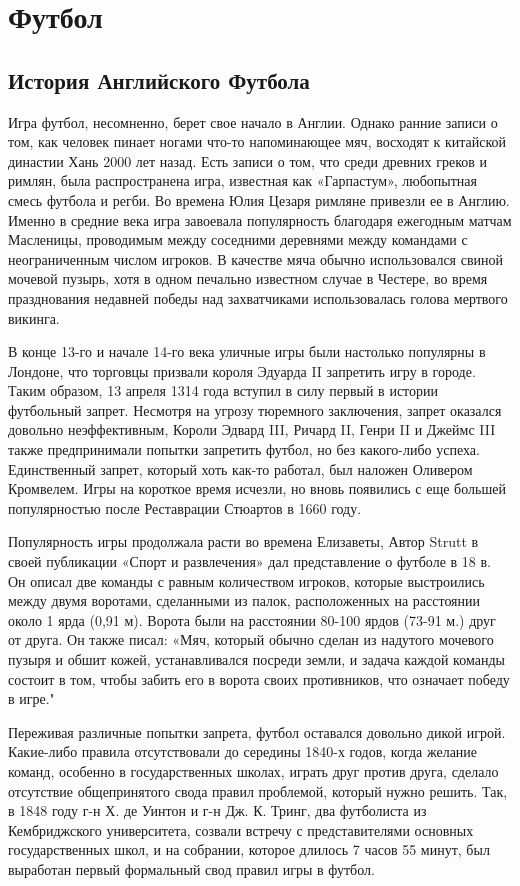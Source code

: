 \section{Футбол}
\subsection{История Английского Футбола}

Игра футбол, несомненно, берет свое начало в Англии. Однако ранние записи о том, как человек пинает ногами что-то напоминающее мяч, восходят к китайской династии Хань 2000 лет назад. Есть записи о том, что среди древних греков и римлян, была распространена игра, известная как «Гарпастум», любопытная смесь футбола и регби. Во времена Юлия Цезаря римляне привезли ее в Англию. Именно в средние века игра завоевала популярность благодаря ежегодным матчам Масленицы, проводимым между соседними деревнями между командами с неограниченным числом игроков. В качестве мяча обычно использовался свиной мочевой пузырь, хотя в одном печально известном случае в Честере, во время празднования недавней победы над захватчиками использовалась голова мертвого викинга.

В конце 13-го и начале 14-го века уличные игры были настолько популярны в Лондоне, что торговцы призвали короля Эдуарда II запретить игру в городе.  Таким образом, 13 апреля 1314 года вступил в силу первый в истории футбольный запрет. Несмотря на угрозу тюремного заключения, запрет оказался довольно неэффективным, Короли Эдвард III, Ричард II, Генри II и Джеймс III также предпринимали попытки запретить футбол, но без какого-либо успеха. Единственный запрет, который хоть как-то работал, был наложен Оливером Кромвелем. Игры на короткое время исчезли, но вновь появились с еще большей популярностью после Реставрации Стюартов в 1660 году.

Популярность игры продолжала расти во времена Елизаветы, Автор Strutt в своей публикации «Спорт и развлечения» дал представление о футболе в 18 в. Он описал две команды с равным количеством игроков, которые выстроились между двумя воротами, сделанными из палок, расположенных на расстоянии около 1 ярда (0,91 м). Ворота были на расстоянии 80-100 ярдов (73-91 м.) друг от друга. Он также писал: «Мяч, который обычно сделан из надутого мочевого пузыря и обшит кожей, устанавливался посреди земли, и задача каждой команды состоит в том, чтобы забить его в ворота своих противников, что означает победу в игре."

Переживая различные попытки запрета, футбол оставался довольно дикой игрой. Какие-либо правила отсутствовали до середины 1840-х годов, когда желание команд, особенно в государственных школах, играть друг против друга, сделало отсутствие общепринятого свода правил проблемой, который нужно решить. Так, в 1848 году г-н Х. де Уинтон и г-н Дж. К. Тринг, два футболиста из Кембриджского университета, созвали встречу с представителями основных государственных школ, и на собрании, которое длилось 7 часов 55 минут, был выработан первый формальный свод правил игры в футбол.

